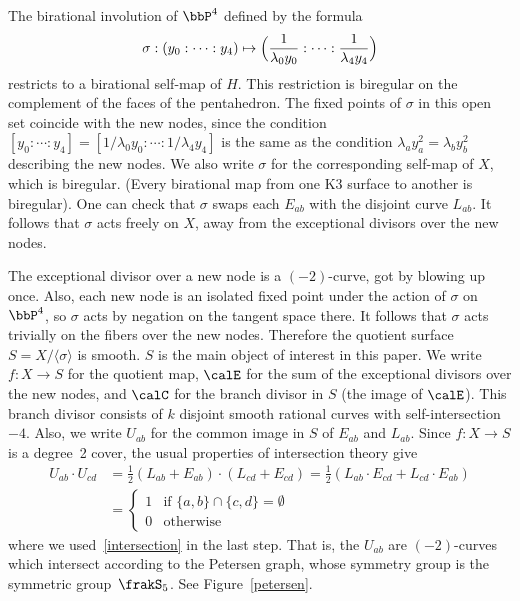 The birational involution of $\bbP^4$ defined by the formula
\[
\sigma:(y_0:\cdots:y_4)\mapsto \Bigl(\frac{1}{\lambda_0y_0}:\cdots:\frac{1}{\lambda_4y_4}\Bigr)
\]
restricts to a birational self-map of $H$. This restriction is biregular on the complement of the faces of the pentahedron. The fixed points of $\sigma$ in this open set coincide with the new nodes, since the condition $[y_0:\cdots:y_4]=[1/\lambda_0y_0:\cdots:1/\lambda_4y_4]$ is the same as the condition $\lambda_ay_a^2=\lambda_by_b^2$ describing the new nodes. We also write $\sigma$ for the corresponding self-map of $X$, which is biregular. (Every birational map from one K3 surface to another is biregular). One can check that $\sigma$ swaps each $E_{ab}$ with the disjoint curve $L_{ab}$. It follows that $\sigma$ acts freely on $X$, away from the exceptional divisors over the new nodes.

The exceptional divisor over a new node is a $(-2)$-curve, got by blowing up once. Also, each new node is an isolated fixed point under the action of $\sigma$ on $\bbP^4$, so $\sigma$ acts by negation on the tangent space there. It follows that $\sigma$ acts trivially on the fibers over the new nodes. Therefore the quotient surface $S=X/\langle\sigma\rangle$ is smooth. $S$ is the main object of interest in this paper. We write $f:X\to S$ for the quotient map, $\calE$ for the sum of the exceptional divisors over the new nodes, and $\calC$ for the branch divisor in $S$ (the image of $\calE$). This branch divisor consists of $k$ disjoint smooth rational curves with self-intersection~$-4$. Also, we write $U_{ab}$ for the common image in $S$ of $E_{ab}$ and $L_{ab}$. Since $f:X\to S$ is a degree~2 cover, the usual properties of intersection theory give
\begin{align*}
U_{ab}\cdot U_{cd} &{}= \frac{1}{2}(L_{ab}+E_{ab})\cdot (L_{cd}+E_{cd}) =\frac{1}{2} (L_{ab}\cdot E_{cd}+L_{cd}\cdot E_{ab})
\\
&{}=
\begin{cases}
1&\text{if }\{a,b\}\cap\{c,d\}=\emptyset\\
0&\text{otherwise}
\end{cases}
\end{align*}
where we used~\eqref{intersection} in the last step. That is, the $U_{ab}$ are $(-2)$-curves which intersect according to the Petersen graph, whose symmetry group is the symmetric group~$\frakS_5$. See Figure~\ref{petersen}.


